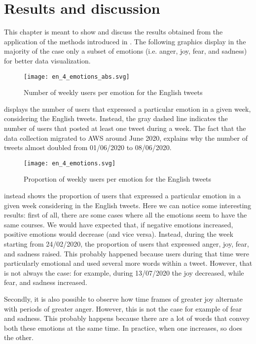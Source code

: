 \graphicspath{{chapters/chapter4/img/}}

\chapter{Results and discussion}
\label{cha:results}

This chapter is meant to show and discuss the results obtained from the application of the methods introduced in . The following graphics display in the majority of the case only a subset of emotions (i.e. anger, joy, fear, and sadness) for better data visualization.

\begin{figure}[H]
	\centering
    	\texttt{[image: en\_4\_emotions\_abs.svg]}
    	\caption{Number of weekly users per emotion for the English tweets}
    	\label{fig:en-4-emotions-abs}
\end{figure}

 displays the number of users that expressed a particular emotion in a given week, considering the English tweets. Instead, the gray dashed line indicates the number of users that posted at least one tweet during a week. The fact that the data collection migrated to AWS around June 2020, explains why the number of tweets almost doubled from 01/06/2020 to 08/06/2020.

\begin{figure}[H]
	\centering
    	\texttt{[image: en\_4\_emotions.svg]}
    	\caption{Proportion of weekly users per emotion for the English tweets}
    	\label{fig:en-4-emotions}
\end{figure}

 instead shows the proportion of users that expressed a particular emotion in a given week considering in the English tweets. Here we can notice some interesting results: first of all, there are some cases where all the emotions seem to have the same courses. We would have expected that, if negative emotions increased, positive emotions would decrease (and vice versa). Instead, during the week starting from 24/02/2020, the proportion of users that expressed anger, joy, fear, and sadness raised. This probably happened because users during that time were particularly emotional and used several more words within a tweet. However, that is not always the case: for example, during 13/07/2020 the joy decreased, while fear, and sadness increased.

Secondly, it is also possible to observe how time frames of greater joy alternate with periods of greater anger. However, this is not the case for example of fear and sadness. This probably happens because there are a lot of words that convey both these emotions at the same time. In practice, when one increases, so does the other.

